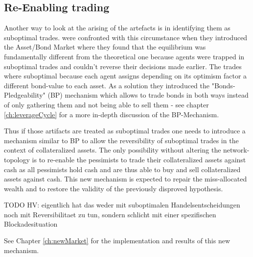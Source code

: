 \documentclass[Bachelorarbeit.tex]{subfiles}
\begin{document}
\subsection{Re-Enabling trading}
\label{ch:interpretation_reenablingTrading}
Another way to look at the arising of the artefacts is in identifying them as suboptimal trades. \cite{Breuer2015} were confronted with this circumstance when they introduced the Asset/Bond Market where they found that the equilibrium was fundamentally different from the theoretical one because agents were trapped in suboptimal trades and couldn't reverse their decisions made earlier. The trades where suboptimal because each agent assigns depending on its optimism factor a different bond-value to each asset. As a solution they introduced the "Bonds-Pledgeability" (BP) mechanism which allows to trade bonds in both ways instead of only gathering them and not being able to sell them - see chapter \ref{ch:leverageCycle} for a more in-depth discussion of the BP-Mechanism.

\medskip 

Thus if those artifacts are treated as suboptimal trades one needs to introduce a mechanism similar to BP to allow the reversibility of suboptimal trades in the context of collateralized assets. The only possibility without altering the network-topology is to re-enable the pessimists to trade their collateralized assets against cash as all pessimists hold cash and are thus able to buy and sell collateralized assets against cash. This new mechanism is expected to repair the miss-allocated wealth and to restore the validity of the previously disproved hypothesis.

TODO HV: eigentlich hat das weder mit suboptimalen Handelsentscheidungen noch mit Reversibilitaet zu tun, sondern schlicht mit einer spezifischen Blockadesituation

\medskip 

See Chapter \ref{ch:newMarket} for the implementation and results of this new mechanism.
\end{document}
